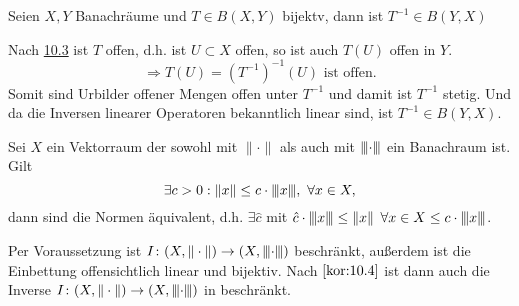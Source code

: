\begin{kor} \label{kor:10.4}
	Seien $X, Y$ Banachräume und $T \in B(X, Y)$ bijektv, dann ist $T^{-1} \in B(Y, X)$	
\end{kor}

\begin{beweis}
	Nach \hyperref[satz:10.3-offeneAbbildung]{10.3} ist $T$ offen, d.h. ist $U \subset X$ offen, so ist auch $T(U)$ offen in $Y$. \\
	\[ \Rightarrow T(U) = \left( T^{-1} \right)^{-1}(U) \text{ ist offen.} \]
	Somit sind Urbilder offener Mengen offen unter $T^{-1}$ und damit ist $T^{-1}$ stetig. Und da die Inversen linearer Operatoren bekanntlich linear sind, 	ist $T^{-1} \in B(Y, X)$.
\end{beweis}


\begin{kor} \label{kor:10.5}
	Sei $X$	ein Vektorraum der sowohl mit $\| \cdot \|$ als auch mit $\vertiii{\cdot}$ ein Banachraum ist. Gilt 
		\[ \exists c > 0: \| x \| \leq c \cdot \vertiii{x}, ~ \forall x \in X, \]
		dann sind die Normen äquivalent, d.h. $\exists \hat{c} $ mit $\hat{c} \cdot \vertiii{x} \leq \| x \|$ $\forall x \in X \leq c \cdot \vertiii{x}$. 
\end{kor}

\begin{beweis}
	Per Voraussetzung ist $I \colon (X, \| \cdot \|) \rightarrow (X, \vertiii{\cdot})$ beschränkt, außerdem ist die Einbettung offensichtlich linear und bijektiv. Nach $\ref{kor:10.4}$ ist dann auch die Inverse $I \colon (X, \| \cdot \|) \rightarrow (X, \vertiii{\cdot})$ in beschränkt.
\end{beweis}



\newpage
